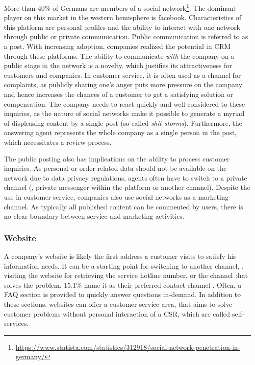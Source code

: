 		More than 40\% of Germans are members of a social network\footnote{\cf \url{https://www.statista.com/statistics/312918/social-network-penetration-in-germany/}}. The dominant player on this market in the western hemisphere is facebook. Characteristics of this platform are personal profiles and the ability to interact with one network through public or private communication. Public communication is referred to as a post. With increasing adoption, companies realized the potential in \acrshort{CRM} through these platforms. The ability to communicate \textit{with} the company on a public stage in the network is a novelty, which justifies its attractiveness for customers and companies. In customer service, it is often used as a channel for complaints, as publicly sharing one's anger puts more pressure on the company and hence increases the chances of a customer to get a satisfying solution or compensation. The company needs to react quickly and well-considered to these inquiries, as the nature of social networks make it possible to generate a myriad of displeasing content by a single post (so called \textit{shit storms}). Furthermore, the answering agent represents the whole company as a single person in the post, which necessitates a review process. 
		
		The public posting also has implications on the ability to process customer inquiries. As personal or order related data should not be available on the network due to data privacy regulations, agents often have to switch to a private channel (\eg, private messenger within the platform or another channel). Despite the use in customer service, companies also use social networks as a marketing channel. As typically all published content can be commented by users, there is no clear boundary between service and marketing activities. 
		
		
		\subsubsection{Website}
		
		A company's website is likely the first address a customer visits to satisfy his information needs. It can be a starting point for switching to another channel, \ie, visiting the website for retrieving the service hotline number, or the channel that solves the problem. 15.1\% name it as their preferred contact channel \citep{Agnischock2015}. Often, a \acrfull{FAQ} section is provided to quickly answer questions in-demand. In addition to these sections, websites can offer a customer service area, that aims to solve customer problems without personal interaction of a \acrshort{CSR}, which are called self-services. 
			
